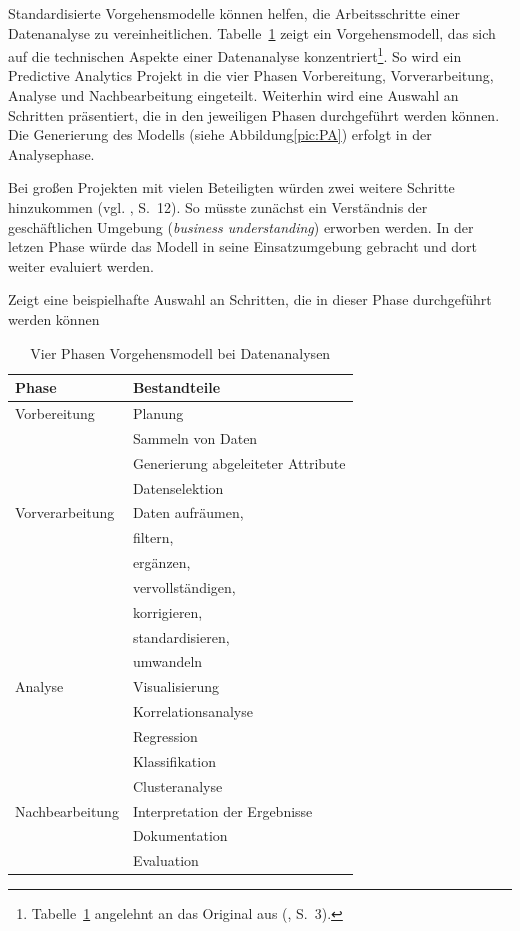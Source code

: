 Standardisierte Vorgehensmodelle können helfen, die Arbeitsschritte einer
Datenanalyse zu vereinheitlichen. Tabelle~\ref{tab:Vier_Phasen} zeigt ein
Vorgehensmodell, das sich auf die technischen Aspekte einer Datenanalyse
konzentriert\footnote{
Tabelle~\ref{tab:Vier_Phasen} angelehnt an das Original aus (\cite{Runkler}, S.~3).
}. So wird ein Predictive Analytics Projekt in die vier Phasen Vorbereitung,
Vorverarbeitung, Analyse und Nachbearbeitung eingeteilt. Weiterhin wird eine
Auswahl an Schritten präsentiert, die in den jeweiligen Phasen durchgeführt werden
können. Die Generierung des Modells (siehe Abbildung\ref{pic:PA}) erfolgt in der Analysephase.

Bei großen Projekten mit vielen Beteiligten würden zwei weitere Schritte
hinzukommen (vgl. \cite{crispdm}, S.~12). So müsste zunächst ein Verständnis der
geschäftlichen Umgebung (\emph{business understanding}) erworben werden. In der letzen Phase
würde das Modell in seine Einsatzumgebung gebracht und dort weiter evaluiert werden.






Zeigt eine beispielhafte Auswahl an Schritten, die in dieser Phase durchgeführt
werden können

\begin{table}
\centering
\caption{Vier Phasen Vorgehensmodell bei Datenanalysen}
\label{tab:Vier_Phasen}
\begin{tabular}{ |l|l| }
\hline
\textbf{Phase} & \textbf{Bestandteile} \\
\hline
Vorbereitung & Planung \\
  & Sammeln von Daten \\
  & Generierung abgeleiteter Attribute \\
  & Datenselektion \\
\hline
Vorverarbeitung & Daten aufräumen, \\
  & filtern, \\
  & ergänzen, \\
  & vervollständigen, \\
  & korrigieren, \\
  & standardisieren, \\
  & umwandeln \\
\hline
Analyse & Visualisierung \\
  & Korrelationsanalyse \\
  & Regression \\
  & Klassifikation \\
  & Clusteranalyse \\
\hline
Nachbearbeitung & Interpretation der Ergebnisse \\
  & Dokumentation \\
  & Evaluation \\
\hline
\end{tabular}
\end{table}

